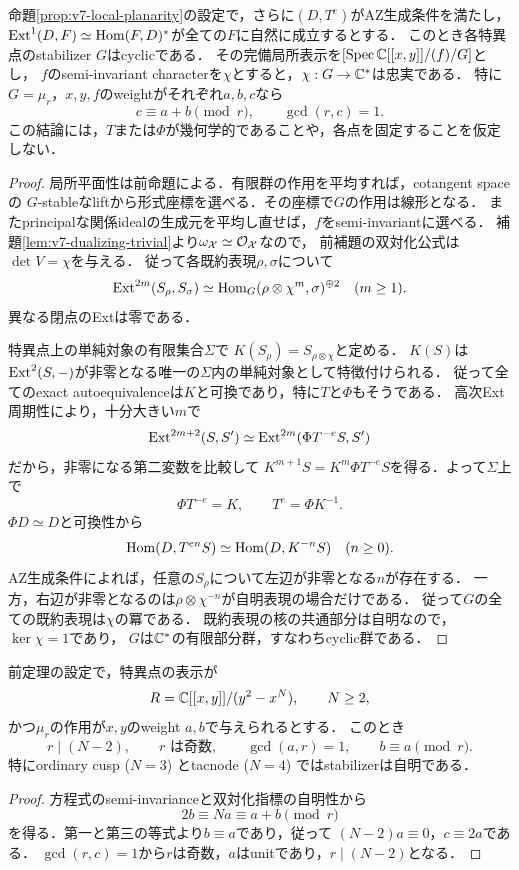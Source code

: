 \documentclass[11pt,a4paper]{ltjsarticle}
\begin{document}
\begin{theorem}[特異点の方程式指標は忠実である]\label{thm:v7-faithful-equation-character}
命題\ref{prop:v7-local-planarity}の設定で，さらに$(D,T^e)$がAZ生成条件を満たし，
$\operatorname{Ext}^1(D,F)\simeq\operatorname{Hom}(F,D)^*$が全ての$F$に自然に成立するとする．
このとき各特異点のstabilizer $G$はcyclicである．
その完備局所表示を$[\operatorname{Spec}\mathbb C[[x,y]]/(f)/G]$とし，
$f$のsemi-invariant characterを$\chi$とすると，$\chi:G\to\mathbb C^*$は忠実である．
特に$G=\mu_r$，$x,y,f$のweightがそれぞれ$a,b,c$なら
\[
 c\equiv a+b\pmod r,\qquad \gcd(r,c)=1.
\]
この結論には，$T$または$\Phi$が幾何学的であることや，各点を固定することを仮定しない．
\end{theorem}
\begin{proof}
局所平面性は前命題による．有限群の作用を平均すれば，cotangent spaceの
$G$-stableなliftから形式座標を選べる．その座標で$G$の作用は線形となる．
またprincipalな関係idealの生成元を平均し直せば，$f$をsemi-invariantに選べる．
補題\ref{lem:v7-dualizing-trivial}より$\omega_{\mathcal X}\simeq\mathcal O_{\mathcal X}$なので，
前補題の双対化公式は$\det V=\chi$を与える．
従って各既約表現$\rho,\sigma$について
\[
 \operatorname{Ext}^{2m}(S_\rho,S_\sigma)
 \simeq\operatorname{Hom}_G(\rho\otimes\chi^m,\sigma)^{\oplus2}\quad(m\geq1).
\]
異なる閉点のExtは零である．

特異点上の単純対象の有限集合$\Sigma$で
$K(S_\rho)=S_{\rho\otimes\chi}$と定める．
$K(S)$は$\operatorname{Ext}^2(S,-)$が非零となる唯一の$\Sigma$内の単純対象として特徴付けられる．
従って全てのexact autoequivalenceは$K$と可換であり，特に$T$と$\Phi$もそうである．
高次Ext周期性により，十分大きい$m$で
\[
 \operatorname{Ext}^{2m+2}(S,S')\simeq
 \operatorname{Ext}^{2m}(\Phi T^{-e}S,S')
\]
だから，非零になる第二変数を比較して
$K^{m+1}S=K^m\Phi T^{-e}S$を得る．よって$\Sigma$上で
\[
 \Phi T^{-e}=K,\qquad T^e=\Phi K^{-1}.
\]
$\Phi D\simeq D$と可換性から
\[
 \operatorname{Hom}(D,T^{en}S)\simeq\operatorname{Hom}(D,K^{-n}S)\quad(n\geq0).
\]
AZ生成条件によれば，任意の$S_\rho$について左辺が非零となる$n$が存在する．
一方，右辺が非零となるのは$\rho\otimes\chi^{-n}$が自明表現の場合だけである．
従って$G$の全ての既約表現は$\chi$の冪である．
既約表現の核の共通部分は自明なので，$\ker\chi=1$であり，
$G$は$\mathbb C^*$の有限部分群，すなわちcyclic群である．
\end{proof}

\begin{corollary}[$A_k$型の局所制約]\label{cor:v7-ak-character}
前定理の設定で，特異点の表示が
\[
 R=\mathbb C[[x,y]]/(y^2-x^N),\qquad N\geq2,
\]
かつ$\mu_r$の作用が$x,y$のweight $a,b$で与えられるとする．
このとき
\[
 r\mid(N-2),\qquad r\text{ は奇数},\qquad
 \gcd(a,r)=1,\qquad b\equiv a\pmod r.
\]
特にordinary cusp ($N=3$) とtacnode ($N=4$) ではstabilizerは自明である．
\end{corollary}
\begin{proof}
方程式のsemi-invarianceと双対化指標の自明性から
\[
 2b\equiv Na\equiv a+b\pmod r
\]
を得る．第一と第三の等式より$b\equiv a$であり，従って
$(N-2)a\equiv0$，$c\equiv2a$である．
$\gcd(r,c)=1$から$r$は奇数，$a$はunitであり，$r\mid(N-2)$となる．
\end{proof}
\end{document}

